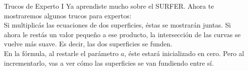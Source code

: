 \begin{surferPage}[Trucos I]{Trucos de Experto I}
Ya aprendiste mucho sobre el SURFER. Ahora te mostraremos algunos trucos para expertos:\\
\vspace{0.3cm}
Si multiplic{\'a}s las ecuaciones de dos superficies, {\'e}stas se mostrar{\'a}n juntas. Si ahora le rest{\'a}s un valor peque{\~n}o a ese producto, la intersecci{\'o}n de las curvas se vuelve m{\'a}s suave. Es decir, las dos superficies se funden.\\
\vspace{0.3cm}
En la f{\'o}rmula, al restarle el par{\'a}metro $a$, {\'e}ste estar{\'a} inicializado en cero. Pero al incrementarlo, vas a ver c{\'o}mo las superficies se van fundiendo entre s{\'i}.
\end{surferPage}
